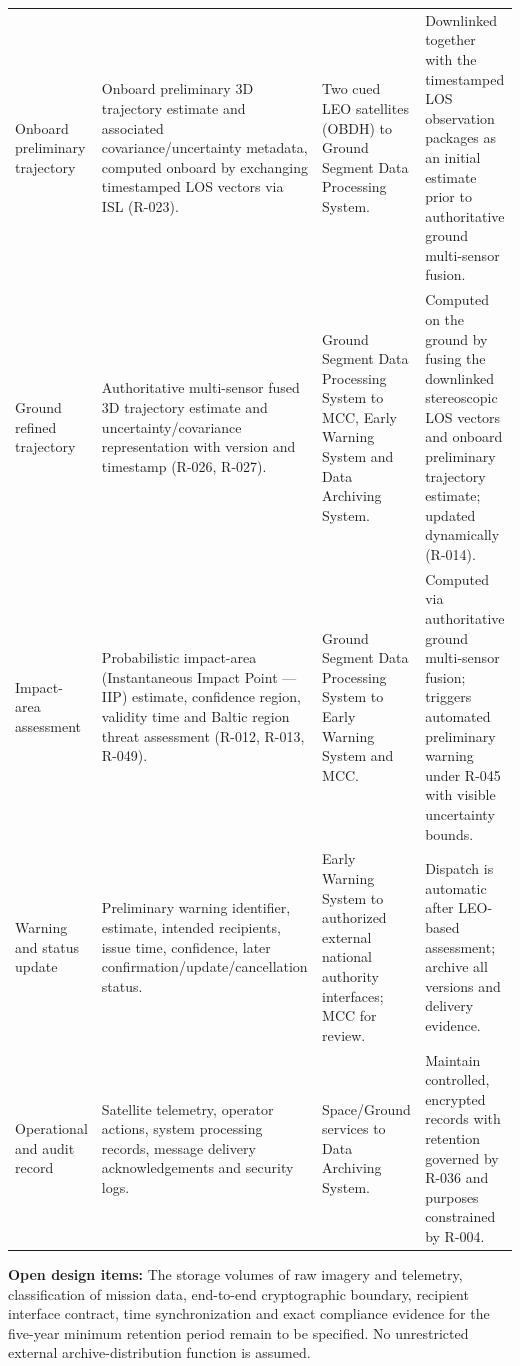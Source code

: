 \begin{longtable}{@{}>{\raggedright\arraybackslash}p{}>{\raggedright\arraybackslash}p{}>{\raggedright\arraybackslash}p{}>{\raggedright\arraybackslash}p{}@{}}
Onboard preliminary trajectory & Onboard preliminary 3D trajectory estimate and associated covariance/uncertainty metadata, computed onboard by exchanging timestamped LOS vectors via ISL (R-023). & Two cued LEO satellites (OBDH) to Ground Segment Data Processing System. & Downlinked together with the timestamped LOS observation packages as an initial estimate prior to authoritative ground multi-sensor fusion. \\
Ground refined trajectory & Authoritative multi-sensor fused 3D trajectory estimate and uncertainty/covariance representation with version and timestamp (R-026, R-027). & Ground Segment Data Processing System to MCC, Early Warning System and Data Archiving System. & Computed on the ground by fusing the downlinked stereoscopic LOS vectors and onboard preliminary trajectory estimate; updated dynamically (R-014). \\
Impact-area assessment & Probabilistic impact-area (Instantaneous Impact Point --- IIP) estimate, confidence region, validity time and Baltic region threat assessment (R-012, R-013, R-049). & Ground Segment Data Processing System to Early Warning System and MCC. & Computed via authoritative ground multi-sensor fusion; triggers automated preliminary warning under R-045 with visible uncertainty bounds. \\
Warning and status update & Preliminary warning identifier, estimate, intended recipients, issue time, confidence, later confirmation/update/cancellation status. & Early Warning System to authorized external national authority interfaces; MCC for review. & Dispatch is automatic after LEO-based assessment; archive all versions and delivery evidence. \\
Operational and audit record & Satellite telemetry, operator actions, system processing records, message delivery acknowledgements and security logs. & Space/Ground services to Data Archiving System. & Maintain controlled, encrypted records with retention governed by R-036 and purposes constrained by R-004. \\
\end{longtable}
\endgroup

\textbf{Open design items:} The storage volumes of raw imagery and telemetry, classification of mission data, end-to-end cryptographic boundary, recipient interface contract, time synchronization and exact compliance evidence for the five-year minimum retention period remain to be specified. No unrestricted external archive-distribution function is assumed.
